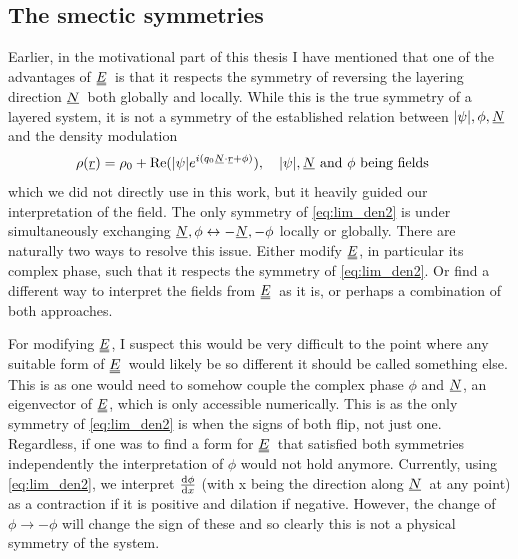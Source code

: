 \documentclass[12pt]{article}
\newcommand{\suf}[2]{\stackunder[0.5pt]{\stackunder[1pt]{\ensuremath{#1}}{\rule{\widthof{\ensuremath{#2}}*\real{0.9}}{.1ex}}}{}}
\newcommand{\duf}[2]{\stackunder[0.5pt]{\stackunder[0.8pt]{\stackunder[1pt]{\ensuremath{#1}}{\rule{\widthof{\ensuremath{#2}}*\real{0.9}}{.1ex}}}{\rule{\widthof{\ensuremath{#2}}*\real{0.9}}{.1ex}}}{}}
\newcommand{\su}[1]{\suf{#1}{#1}}
\newcommand{\du}[1]{\duf{#1}{#1}}
\newcommand{\ssu}[1]{\scriptsize\su{#1}\normalsize}
\newcommand{\NN}{\ensuremath{\su{N}}}
\newcommand{\EE}{\ensuremath{\du{E}}}
\begin{document}
    \subsection{The smectic symmetries}
    Earlier, in the motivational part of this thesis I have mentioned that one of the advantages of \EE\ is that it respects the symmetry of reversing the layering direction \NN\ both globally and locally.
    While this is the true symmetry of a layered system, it is not a symmetry of the established relation between $|\psi|,\phi,\su{N}$ and the density modulation
    \begin{equation}\label{eq:lim_den2}
        \rho(\su{r}) = \rho_0 + \Re(|\psi| e^{i(q_0\ssu{N}\cdot\ssu{r} + \phi)}), \qq{$|\psi|,\su{N}$ and $\phi$ being fields}
    \end{equation}
    which we did not directly use in this work, but it heavily guided our interpretation of the field.
    The only symmetry of \cref{eq:lim_den2} is under simultaneously exchanging $\su{N}, \phi \leftrightarrow -\su{N}, -\phi$ locally or globally.
    There are naturally two ways to resolve this issue.
    Either modify \EE, in particular its complex phase, such that it respects the symmetry of \cref{eq:lim_den2}.
    Or find a different way to interpret the fields from \EE\ as it is, or perhaps a combination of both approaches.

    For modifying \EE, I suspect this would be very difficult to the point where any suitable form of \EE\ would likely be so different it should be called something else.
    This is as one would need to somehow couple the complex phase $\phi$ and \NN, an eigenvector of \EE, which is only accessible numerically.
    This is as the only symmetry of \cref{eq:lim_den2} is when the signs of both flip, not just one.
    Regardless, if one was to find a form for \EE\ that satisfied both symmetries independently the interpretation of $\phi$ would not hold anymore.
    Currently, using \cref{eq:lim_den2}, we interpret $\dv{\phi}{x}$ (with x being the direction along \NN\ at any point) as a contraction if it is positive and dilation if negative.
    However, the change of $\phi \rightarrow -\phi$ will change the sign of these and so clearly this is not a physical symmetry of the system.
\end{document}
